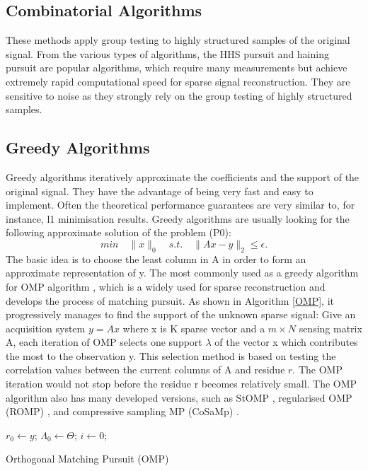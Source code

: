 \subsection{Combinatorial Algorithms}\label{sct:combin-alg}
These methods apply group testing to highly structured samples of the original signal. From the various types of algorithms, the HHS pursuit \cite{gilbert2007one} and haining pursuit\cite{gilbert2006algorithmic} are popular algorithms, which require many measurements but achieve extremely rapid computational speed for sparse signal reconstruction. They are sensitive to noise as they strongly rely on the group testing of highly structured samples.

\subsection{Greedy Algorithms}
Greedy algorithms iteratively approximate the coefficients and the support of the original signal. They have the advantage of being very fast and easy to implement. Often the theoretical performance guarantees are very similar to, for instance, l1 minimisation results. Greedy algorithms are usually looking for the following approximate solution of the problem (P0):
\begin{equation}
min \quad \|x\|_0 \quad s.t. \quad \| Ax - y \|_2 \leq \epsilon.
\end{equation}
The basic idea is to choose the least column in A in order to form an approximate representation of y. The most commonly used as a greedy algorithm for OMP algorithm \cite{mallat1993matching}, which is a widely used for sparse reconstruction and develops the process of matching pursuit. As shown in Algorithm \ref{OMP}, it progressively manages to find the support of the unknown sparse signal: Give an acquisition system $y = Ax$ where x is K sparse vector and a $m \times N$ sensing matrix A, each iteration of OMP selects one support $\lambda$ of the vector x which contributes the most to the observation y. This selection method is based on testing the correlation values between the current columns of A and residue $r$. The OMP iteration would not stop before the residue r becomes relatively small. The OMP algorithm also has many developed versions, such as StOMP \cite{donoho2006sparse}, regularised OMP (ROMP) \cite{needell2009uniform}, and compressive sampling MP (CoSaMp) \cite{needell2009cosamp}.

\IncMargin{1em}
\begin{algorithm}
    \BlankLine
$r_0 \gets y$; $\Lambda_0 \gets \Theta$; $i \gets 0$; \;
\caption{Orthogonal Matching Pursuit (OMP)}\label{OMP}
\end{algorithm}
\DecMargin{1em}
